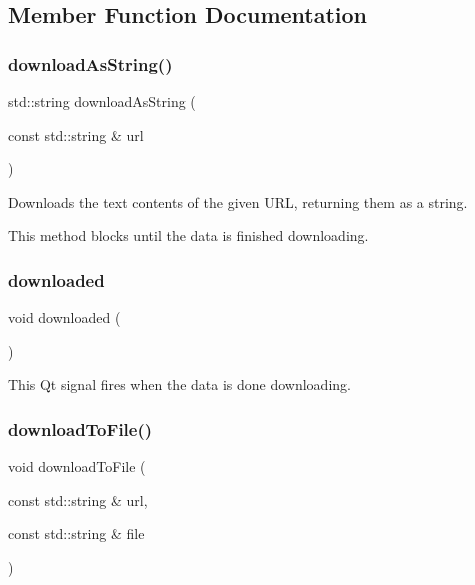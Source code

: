 \subsection{Member Function Documentation}
\mbox{\label{classsgl_1_1GDownloader_a27b002ce17000e199302c608363c97a2}} 
\subsubsection{\texorpdfstring{download\+As\+String()}{downloadAsString()}}
{\footnotesize\ttfamily std\+::string download\+As\+String (\begin{DoxyParamCaption}\item[{const std\+::string \&}]{url }\end{DoxyParamCaption})}



Downloads the text contents of the given U\+RL, returning them as a string. 

This method blocks until the data is finished downloading. \mbox{\label{classsgl_1_1GDownloader_abb5cf1dbe464e3dc8943c261934b9a64}} 
\subsubsection{\texorpdfstring{downloaded}{downloaded}}
{\footnotesize\ttfamily void downloaded (\begin{DoxyParamCaption}{ }\end{DoxyParamCaption})\hspace{0.3cm}{\ttfamily [signal]}}



This Qt signal fires when the data is done downloading. 

\mbox{\label{classsgl_1_1GDownloader_a0bf57f044cc66c8aab40f3f2179caf21}} 
\subsubsection{\texorpdfstring{download\+To\+File()}{downloadToFile()}}
{\footnotesize\ttfamily void download\+To\+File (\begin{DoxyParamCaption}\item[{const std\+::string \&}]{url,  }\item[{const std\+::string \&}]{file }\end{DoxyParamCaption})}



